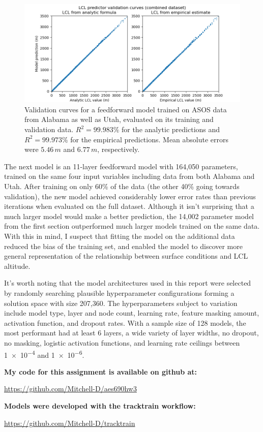 \documentclass[11pt]{article}
\begin{document}
\begin{figure}[h!]
    \centering

    \includegraphics[width=.6\paperwidth]{figs/val_ff-combined-01_combined.png}

    \caption{Validation curves for a feedforward model trained on ASOS data from Alabama as well as Utah, evaluated on its training and validation data. $R^2=99.983\%$ for the analytic predictions and $R^2=99.973\%$ for the empirical predictions. Mean absolute errors were $5.46\,\si{m}$ and $6.77\,\si{m}$, respectively.}
    \label{f3}
\end{figure}

The next model is an 11-layer feedforward model with 164,050 parameters, trained on the same four input variables including data from both Alabama and Utah. After training on only 60\% of the data (the other 40\% going towards validation), the new model achieved considerably lower error rates than previous iterations when evaluated on the full dataset. Although it isn't surprising that a much larger model would make a better prediction, the 14,002 parameter model from the first section outperformed much larger models trained on the same data. With this in mind, I suspect that fitting the model on the additional data  reduced the bias of the training set, and enabled the model to discover more general representation of the relationship between surface conditions and LCL altitude.

It's worth noting that the model architectures used in this report were selected by randomly searching plausible hyperparameter configurations forming a solution space with size 207,360. The hyperparameters subject to variation include model type, layer and node count, learning rate, feature masking amount, activation function, and dropout rates. With a sample size of 128 models, the most performant had at least 6 layers, a wide variety of layer widths, no dropout, no masking, logistic activation functions, and learning rate ceilings between \num{1e-4} and \num{1e-6}.

\vspace{1em}
\centering\large
\textbf{My code for this assignment is available on github at:}

\centering\large
\url{https://github.com/Mitchell-D/aes690hw3}

\vspace{.5em}

\centering\large
\textbf{Models were developed with the tracktrain workflow:}

\centering\large
\url{https://github.com/Mitchell-D/tracktrain}
\end{document}
